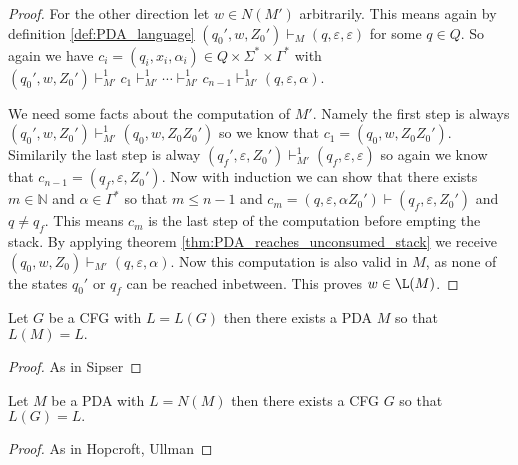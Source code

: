 \begin{proof}
  For the other direction let  $w\in N(M')$ arbitrarily. This means again by definition
  \ref{def:PDA_language} $(q_0',w,Z_0')\vdash_M(q,\varepsilon,\varepsilon)$ for some $q\in Q$.
  So again we have $c_i=(q_i,x_i,\alpha_i)\in Q\times\Sigma^*\times\Gamma^*$ with
  $(q_0',w,Z_0')\vdash^1_{M'} c_1\vdash^1_{M'}\cdots\vdash^1_{M'} c_{n-1}\vdash^1_{M'}(q,\varepsilon,\alpha)$.

  We need some facts about the computation of $M'$. Namely the first step is always
  $(q_0',w,Z_0')\vdash^1_{M'} (q_0,w,Z_0Z_0')$ so we know that $c_1=(q_0,w,Z_0Z_0')$.
  Similarily the last step is alway
  $(q_f',\varepsilon,Z_0')\vdash^1_{M'} (q_f,\varepsilon,\varepsilon)$
  so again we know that $c_{n-1}=(q_f,\varepsilon,Z_0')$. Now with induction we can
  show that there exists $m\in\mathbb{N}$ and $\alpha\in\Gamma^*$ so that $m\le n-1$ and
  $c_{m}=(q,\varepsilon,\alpha Z_0')\vdash(q_f,\varepsilon,Z_0')$ and $q\neq q_f$.
  This means $c_{m}$ is the last step of the computation before empting the stack.
  By applying theorem \ref{thm:PDA_reaches_unconsumed_stack} we receive
  $(q_0,w,Z_0)\vdash_{M'}(q,\varepsilon,\alpha)$. Now this computation is
  also valid in $M$, as none of the states $q_0'$ or $q_f$ can be reached inbetween.
  This proves $w\in\L(M)$.

\end{proof}

\begin{theorem}\label{thm:PDA_of_CFG}
  Let $G$ be a CFG with $L=L(G)$ then there exists a PDA $M$ so that $L(M)=L.$
\end{theorem}
\begin{proof}
  As in Sipser
\end{proof}
\begin{theorem}\label{thm:CFG_of_PDA}
  Let $M$ be a PDA with $L=N(M)$ then there exists a CFG $G$ so that $L(G)=L.$
\end{theorem}
\begin{proof}
  As in Hopcroft, Ullman
\end{proof}
